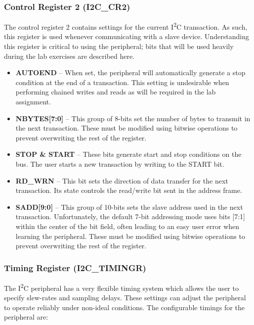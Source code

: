 \documentclass[11pt,fleqn]{book} %
\begin{document}
    \subsubsection{Control Register 2 (I2C\_CR2)}
    The control register 2 contains settings for the current I\textsuperscript{2}C transaction. As such, this register is used whenever communicating with a slave device. Understanding this register is critical to using the peripheral; bits that will be used heavily during the lab exercises are described here. 
    \begin{itemize}
        \item \textbf{AUTOEND} -- When set, the peripheral will automatically generate a stop condition at the end of a transaction. This setting is undesirable when performing chained writes and reads as will be required in the lab assignment. 
        \item \textbf{NBYTES[7:0]} -- This group of 8-bits set the number of bytes to transmit in the next transaction. These must be modified using bitwise operations to prevent overwriting the rest of the register. 
        \item \textbf{STOP \& START} -- These bits generate start and stop conditions on the bus. The user starts a new transaction by writing to the START bit.
        \item \textbf{RD\_WRN} -- This bit sets the direction of data transfer for the next transaction. Its state controls the read/write bit sent in the address frame. 
        \item \textbf{SADD[9:0]} -- This group of 10-bits sets the slave address used in the next transaction. Unfortunately, the default 7-bit addressing mode uses bits [7:1] within the center of the bit field, often leading to an easy user error when learning the peripheral. These must be modified using bitwise operations to prevent overwriting the rest of the register.  
    \end{itemize}
    
    
    \subsubsection{Timing Register (I2C\_TIMINGR)}
    The I\textsuperscript{2}C peripheral has a very flexible timing system which allows the user to specify slew-rates and sampling delays. These settings can adjust the peripheral to operate reliably under non-ideal conditions. The configurable timings for the peripheral are:
    
\end{document}
